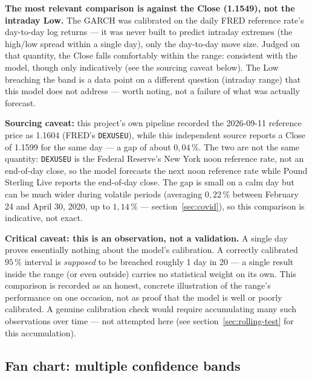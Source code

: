 \documentclass[12pt,a4paper]{article}
\begin{document}
\begin{limitbox}
	\textbf{The most relevant comparison is against the Close (1.1549),
		not the intraday Low.} The GARCH was calibrated on the
	daily FRED reference rate's day-to-day log returns --- it
	was never built to predict intraday extremes
	(the high/low spread within a single day), only
	the day-to-day move size. Judged on that quantity, the
	Close falls comfortably within the range: consistent with
	the model, though only indicatively (see the sourcing caveat
	below). The Low breaching the band is a data point
	on a different question (intraday range) that this
	model does not address --- worth noting, not a failure of
	what was actually forecast.
	
	\textbf{Sourcing caveat:} this project's own pipeline
	recorded the 2026-09-11 reference price as 1.1604
	(FRED's \texttt{DEXUSEU}), while this independent source
	reports a Close of 1.1599 for the same day --- a gap
	of about $0{,}04\,\%$. The two are not the same
	quantity: \texttt{DEXUSEU} is the Federal Reserve's New York
	noon reference rate, not an end-of-day close, so the
	model forecasts the next noon reference rate while
	Pound Sterling Live reports the end-of-day close. The gap is
	small on a calm day but can be much wider during
	volatile periods (averaging $0{,}22\,\%$ between February 24 and
	April 30, 2020, up to $1{,}14\,\%$ --- section~\ref{sec:covid}), so
	this comparison is indicative, not exact.
	
	\textbf{Critical caveat: this is an observation, not a
		validation.} A single day proves essentially nothing about
	the model's calibration. A correctly calibrated $95\,\%$
	interval is \emph{supposed} to be breached roughly 1 day in
	20 --- a single result inside the range (or even outside) carries no
	statistical weight on its own. This comparison is recorded as an
	honest, concrete illustration of the range's performance
	on one occasion, not as proof that the model is well or
	poorly calibrated. A genuine calibration check would
	require accumulating many such observations over time --- not
	attempted here (see section~\ref{sec:rolling-test} for this
	accumulation).
\end{limitbox}

\newpage

\subsection{Fan chart: multiple confidence bands}
\label{sec:price-range-fanchart}
\end{document}
